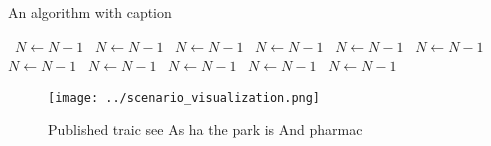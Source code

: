 \documentclass[a4paper]{article}
\begin{document}
\begin{algorithm}
\caption{An algorithm with caption}
\begin{algorithmic}
\    \State $N \gets N - 1$
\    \State $N \gets N - 1$
\    \State $N \gets N - 1$
\    \State $N \gets N - 1$
\    \State $N \gets N - 1$
\    \State $N \gets N - 1$
\    \State $N \gets N - 1$
\    \State $N \gets N - 1$
\    \State $N \gets N - 1$
\    \State $N \gets N - 1$
\    \State $N \gets N - 1$
\EndWhile
\end{algorithmic}
\end{algorithm}

\begin{figure}
\centering
\texttt{[image: ../scenario\_visualization.png]}
\caption{Published traic see As ha the park is And pharmac
}
\end{figure}
 
\end{document}
